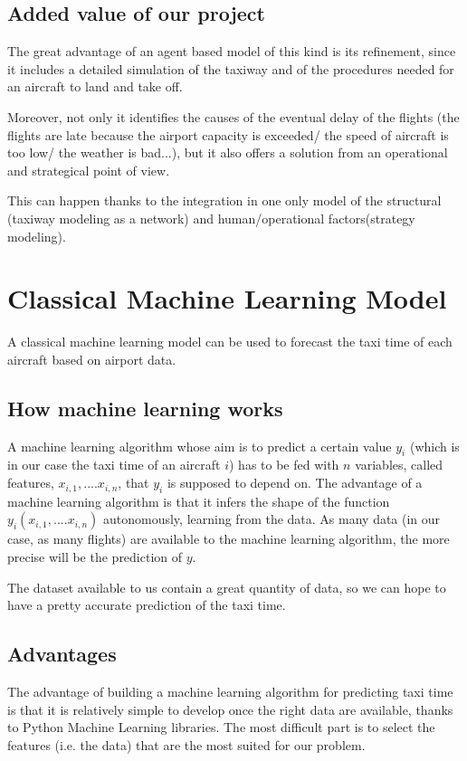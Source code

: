 \documentclass{article}
\begin{document}
\subsection{Added value of our project}
The great advantage of an agent based model of this kind is its refinement, since it includes a detailed simulation of the taxiway and of the procedures needed for an aircraft to land and take off.


Moreover, not only it identifies the causes of the eventual delay of the flights (the flights are late because the airport capacity is exceeded/ the speed of aircraft is too low/ the weather is bad...), but it also offers a solution from an operational and strategical point of view.

This can happen thanks to the integration in one only model of the structural (taxiway modeling as a network) and human/operational factors(strategy modeling).
\section{Classical Machine Learning Model}
A classical machine learning model can be used to forecast the taxi time of each aircraft based on airport data. 

\subsection{How machine learning works}
A machine learning algorithm whose aim is to predict a certain value $y_i$ (which is in our case the taxi time of an aircraft $i$) has to be fed with $n$ variables, called features, $x_{i,1},....x_{i, n}$, that $y_i$ is supposed to depend on. The advantage of a machine learning algorithm is that it infers the shape of the function $y_i(x_{i,1},....x_{i, n})$ autonomously, learning from the data. As many data (in our case, as many flights) are available to the machine learning algorithm, the more precise will be the prediction of $y$.

The dataset available to us contain a great quantity of data, so we can hope to have a pretty accurate prediction of the taxi time. 

\subsection{Advantages}
The advantage of building a machine learning algorithm for predicting taxi time is that it is relatively simple to develop once the right data are available, thanks to Python Machine Learning libraries. The most difficult part is to select the features (i.e. the data) that are the most suited for our problem.
\end{document}
